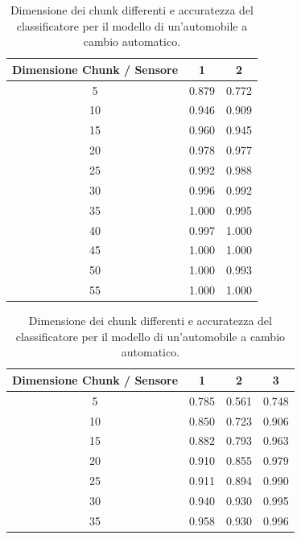 \documentclass[Lau,binding=0.6cm]{sapthesis}
\begin{document}
\begin{table}
    \begin{center}
        \begin{tabular}{|c|c|c|}
            \hline
            \textbf{Dimensione Chunk / Sensore} & \textbf{1} & \textbf{2} \\
            \hline
            5 & 0.879 & 0.772 \\
            \hline
            10 & 0.946 & 0.909 \\
            \hline
            15 & 0.960 & 0.945 \\
            \hline
            20 & 0.978 & 0.977 \\
            \hline
            25 & 0.992 & 0.988 \\
            \hline
            30 & 0.996 & 0.992 \\
            \hline
            35 & 1.000 & 0.995 \\
            \hline
            40 & 0.997 & 1.000 \\
            \hline
            45 & 1.000 & 1.000 \\
            \hline
            50 & 1.000 & 0.993 \\
            \hline
            55 & 1.000 & 1.000 \\
            \hline
        \end{tabular}
    \end{center}
    \caption{Dimensione dei chunk differenti e accuratezza del classificatore per il modello di un'automobile a cambio automatico.}
    \label{tab:2}
    \begin{center}
        \begin{tabular}{|c|c|c|c|}
            \hline
            \textbf{Dimensione Chunk / Sensore} & \textbf{1} & \textbf{2} & \textbf{3} \\
            \hline
            5 & 0.785 & 0.561 & 0.748 \\
            \hline
            10 & 0.850 & 0.723 & 0.906 \\
            \hline
            15 & 0.882 & 0.793 & 0.963 \\
            \hline
            20 & 0.910 & 0.855 & 0.979 \\
            \hline
            25 & 0.911 & 0.894 & 0.990 \\
            \hline
            30 & 0.940 & 0.930 & 0.995 \\
            \hline
            35 & 0.958 & 0.930 & 0.996 \\

\end{tabular}
\end{center}
\end{table}
\end{document}
